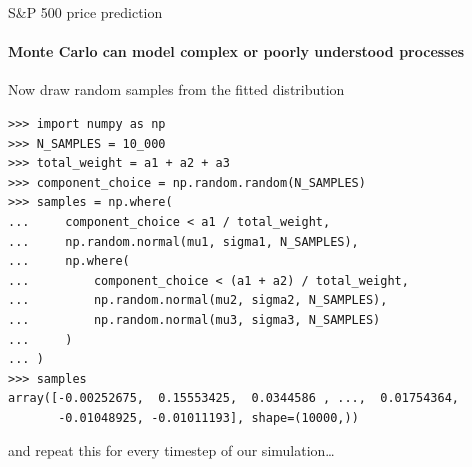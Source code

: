 \documentclass{beamer}
\begin{document}
\begin{frame}[fragile]{S\&P 500 price prediction}
\framesubtitle{Monte Carlo can model complex or poorly understood processes}

Now draw random samples from the fitted distribution

\vspace{0.5cm}

\begin{lstlisting}
>>> import numpy as np
>>> N_SAMPLES = 10_000
>>> total_weight = a1 + a2 + a3
>>> component_choice = np.random.random(N_SAMPLES)
>>> samples = np.where(
...     component_choice < a1 / total_weight,
...     np.random.normal(mu1, sigma1, N_SAMPLES),
...     np.where(
...         component_choice < (a1 + a2) / total_weight,
...         np.random.normal(mu2, sigma2, N_SAMPLES),
...         np.random.normal(mu3, sigma3, N_SAMPLES)
...     )
... )
>>> samples
array([-0.00252675,  0.15553425,  0.0344586 , ...,  0.01754364,
       -0.01048925, -0.01011193], shape=(10000,))
\end{lstlisting}

\vspace{0.5cm}

and repeat this for every timestep of our simulation\dots

\end{frame}
\end{document}
